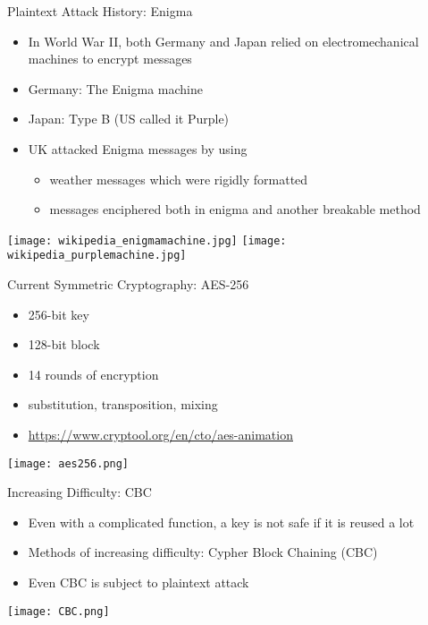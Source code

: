 \begin{withoutheadline}
\begin{frame}{Plaintext Attack History: Enigma}
\begin{itemize}
    \item In World War II, both Germany and Japan relied on electromechanical machines to encrypt messages
    \item Germany: The Enigma machine
    \item Japan: Type B (US called it Purple)
    \item UK attacked Enigma messages by using
    \begin{itemize} 
        \item weather messages which were rigidly formatted
        \item messages enciphered both in enigma and another breakable method
    \end{itemize}
\end{itemize}
\texttt{[image: wikipedia\_enigmamachine.jpg]}
\texttt{[image: wikipedia\_purplemachine.jpg]}
\end{frame}

\begin{frame}{Current Symmetric Cryptography: AES-256}
    \begin{itemize}
        \item 256-bit key
        \item 128-bit block
        \item 14 rounds of encryption
        \item substitution, transposition, mixing
        \item \url{https://www.cryptool.org/en/cto/aes-animation}
    \end{itemize}
    \texttt{[image: aes256.png]}
\end{frame}

\begin{frame}{Increasing Difficulty: CBC}
    \begin{itemize}
        \item Even with a complicated function, a key is not safe if it is reused a lot
        \item Methods of increasing difficulty: Cypher Block Chaining (CBC)
        \item Even CBC is subject to plaintext attack
    \end{itemize}
    \texttt{[image: CBC.png]}
\end{frame}


\end{withoutheadline}
